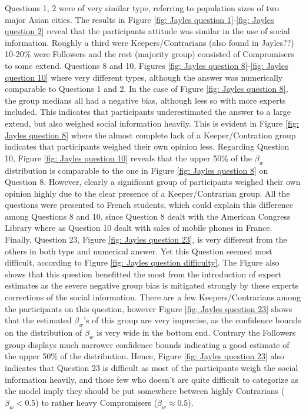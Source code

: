 \documentclass[10pt,a4paper,twocolumn,lineno]{article}
\begin{document}
Questions 1, 2 were of very similar type, referring to population sizes of two major Asian cities. The results in Figure \ref{fig: Jayles question 1}-\ref{fig: Jayles question 2} reveal that the participants attitude was similar in the use of social information. Roughly a third were Keepers/Contrarians (also found in Jayles??) 10-20\% were Followers and the rest (majority group) consisted of Compromisers to some extend. Questions 8 and 10, Figures \ref{fig: Jayles question 8}-\ref{fig: Jayles question 10} where very different types, although the answer was numerically comparable to Questions 1 and 2. In the case of Figure \ref{fig: Jayles question 8}, the group medians all had a negative bias, although less so with more experts included. This indicates that participants underestimated the answer to a large extend, but also weighed social information heavily. This is evident in Figure \ref{fig: Jayles question 8} where the almost complete lack of a Keeper/Contration group indicates that participants weighed their own opinion less. Regarding Question 10, Figure \ref{fig: Jayles question 10} reveals that the upper 50\% of the $\beta_w$ distribution is comparable to the one in Figure \ref{fig: Jayles question 8} on Question 8. However, clearly a significant group of participants weighed their own opinion highly due to the clear presence of a Keeper/Contrarian group. All the questions were presented to French students, which could explain this difference among Questions 8 and 10, since Question 8 dealt with the American Congress Library where as Question 10 dealt with sales of mobile phones in France. Finally, Question 23, Figure \ref{fig: Jayles question 23}, is very different from the others in both type and numerical answer. Yet this Question seemed most difficult, according to Figure \ref{fig: Jayles question difficulty}. The Figure also shows that this question benefitted the most from the introduction of expert estimates as the severe negative group bias is mitigated strongly by these experts corrections of the social information. There are a few Keepers/Contrarians among the participants on this question, however Figure \ref{fig: Jayles question 23} shows that the estimated $\beta_w$'s of this group are very imprecise, as the confidence bounds on the distribution of $\beta_w$ is very wide in the bottom end. Contrary the Followers group displays much narrower confidence bounds indicating a good estimate of the upper 50\% of the distribution. Hence, Figure \ref{fig: Jayles question 23} also indicates that Question 23 is difficult as most of the participants weigh the social information heavily, and those few who doesn't are quite difficult to categorize as the model imply they should be put somewhere between highly Contrarians ($\beta_w<0.5$) to rather heavy Compromisers ($\beta_w\approx 0.5$).
\end{document}
